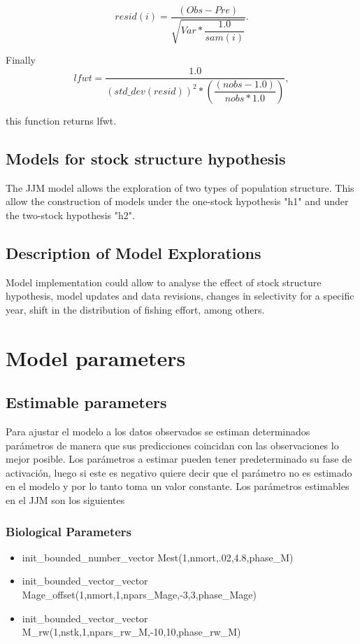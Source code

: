 \documentclass{article}
\begin{document}
\begin{equation}
    resid(i) = \dfrac{(Obs - Pre)}{\sqrt{Var * \dfrac{1.0}{ sam(i) }}}.
\end{equation}

Finally
\begin{equation}
     lfwt = \dfrac{1.0}{ (std\_dev(resid))^2 * \left(\dfrac{(nobs - 1.0)}{nobs * 1.0}\right)},
\end{equation}

this function returns lfwt.

\subsection{Models for stock structure hypothesis}

The JJM model allows the exploration of two types of population structure. This allow the construction of models under the one-stock hypothesis "h1" and under the two-stock hypothesis "h2".

\subsection{Description of Model Explorations}

Model implementation could allow to analyse the effect of stock structure hypothesis, model updates and data revisions, changes in selectivity for a specific year, shift in the distribution of fishing effort, among others. 

\section{Model parameters}
\subsection{Estimable parameters}
Para ajustar el modelo a los datos observados se estiman determinados parámetros de manera que sus predicciones coincidan con las observaciones lo mejor posible. Los parámetros a estimar pueden tener predeterminado su fase de activación, luego si este es negativo quiere decir que el parámetro no es estimado en el modelo y por lo tanto toma un valor constante. Los parámetros estimables en el JJM son los siguientes 
\subsubsection{Biological Parameters}
\begin{itemize}
    \item init\_bounded\_number\_vector Mest(1,nmort,.02,4.8,phase\_M)
    \item init\_bounded\_vector\_vector Mage\_offset(1,nmort,1,npars\_Mage,-3,3,phase\_Mage)
    \item  init\_bounded\_vector\_vector M\_rw(1,nstk,1,npars\_rw\_M,-10,10,phase\_rw\_M)
\end{itemize}
\end{document}
